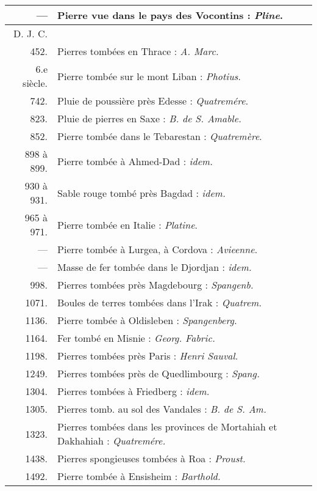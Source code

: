 \documentclass[a4paper, 12pt, oneside, french]{article}
\begin{document}
\begin{center}
\begin{longtable}{r p{85mm}}
        --- & Pierre vue dans le pays des Vocontins : \emph{Pline}.   \\ \hline\hline
        D. J. C. & \\ \hline\hline
        452. & Pierres tombées en Thrace : \emph{A. Marc.}   \\ \hline
        6.e siècle. & Pierre tombée sur le mont Liban : \emph{Photius}.   \\ \hline
        742. & Pluie de poussière près Edesse : \emph{Quatremére}.   \\ \hline
        823. & Pluie de pierres en Saxe : \emph{B. de S. Amable.}   \\ \hline
        852. & Pierre tombée dans le Tebarestan : \emph{Quatremère}.   \\ \hline
        898 à 899. & Pierre tombée à Ahmed-Dad : \emph{idem.}   \\ \hline
        930 à 931. & Sable rouge tombé près Bagdad : \emph{idem.}   \\ \hline
        965 à 971. & Pierre tombée en Italie : \emph{Platine}.   \\ \hline
        --- & Pierre tombée à Lurgea, à Cordova : \emph{Avieenne}.   \\ \hline
        --- & Masse de fer tombée dans le Djordjan : \emph{idem.}   \\ \hline
        998. & Pierres tombées près Magdebourg : \emph{Spangenb.}   \\ \hline
        1071. & Boules de terres tombées dans l'Irak : \emph{Quatrem.}   \\ \hline
        1136. & Pierre tombée à Oldisleben : \emph{Spangenberg.}   \\ \hline
        1164. & Fer tombé en Misnie : \emph{Georg. Fabric.}   \\ \hline
        1198. & Pierres tombées près Paris : \emph{Henri Sauval.}   \\ \hline
        1249. & Pierres tombées près de Quedlimbourg : \emph{Spang.}   \\ \hline
        1304. & Pierres tombées à Friedberg : \emph{idem.}   \\ \hline
        1305. & Pierres tomb. au sol des Vandales : \emph{B. de S. Am.}   \\ \hline
        1323. & Pierres tombées dans les provinces de Mortahiah et Dakhahiah : \emph{Quatremére.}   \\ \hline
        1438. & Pierres spongieuses tombées à Roa : \emph{Proust.}   \\ \hline
        1492. & Pierre tombée à Ensisheim : \emph{Barthold.}   \\ \hline

\end{longtable}
\end{center}
\end{document}
